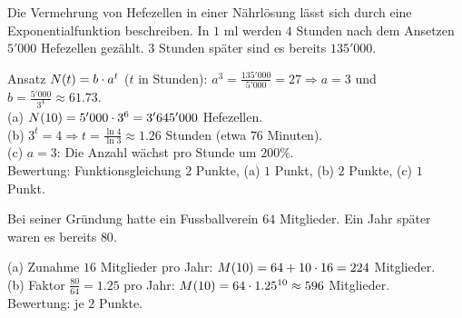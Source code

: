 \documentclass[11pt]{exam}
\begin{document}
\begin{questions}
\newpage
\question[6]
Die Vermehrung von Hefezellen in einer Nährlösung lässt sich durch eine Exponentialfunktion beschreiben. In $1$ ml werden $4$ Stunden nach dem Ansetzen $5'000$ Hefezellen gezählt. $3$ Stunden später sind es bereits $135'000$.
{\begin{solution}
		Ansatz $N(t)=b\cdot a^t$ ($t$ in Stunden): $a^3=\frac{135'000}{5'000}=27\Rightarrow a=3$ und $b=\frac{5'000}{3^4}\approx 61.73$.\\
		(a) $N(10)=5'000\cdot3^6=3'645'000$ Hefezellen.\\
		(b) $3^t=4\Rightarrow t=\frac{\ln{4}}{\ln{3}}\approx 1.26$ Stunden (etwa $76$ Minuten).\\
		(c) $a=3$: Die Anzahl wächst pro Stunde um $200\%$.\\
		Bewertung: Funktionsgleichung $2$ Punkte, (a) $1$ Punkt, (b) $2$ Punkte, (c) $1$ Punkt.
\end{solution}}
{\vfill}

\newpage
\question[4]
Bei seiner Gründung hatte ein Fussballverein $64$ Mitglieder. Ein Jahr später waren es bereits $80$.
{\begin{solution}
		(a) Zunahme $16$ Mitglieder pro Jahr: $M(10)=64+10\cdot16=224$ Mitglieder.\\
		(b) Faktor $\frac{80}{64}=1.25$ pro Jahr: $M(10)=64\cdot1.25^{10}\approx 596$ Mitglieder.\\
		Bewertung: je $2$ Punkte.
\end{solution}}
{\vfill}


\end{questions}
\end{document}
